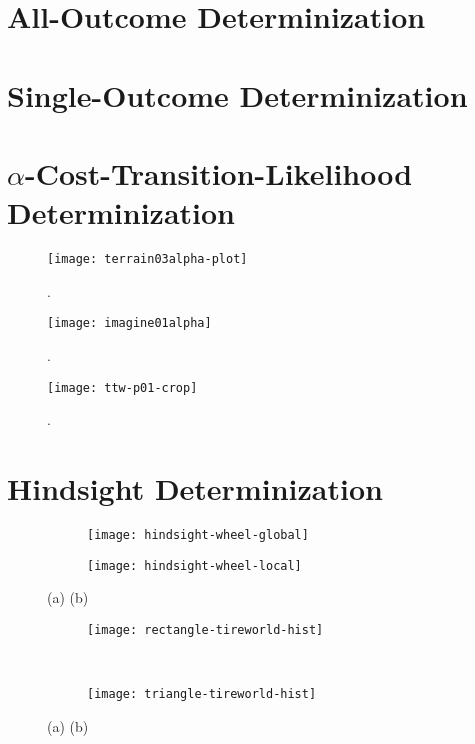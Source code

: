 \documentclass[../root.tex]{subfiles}
\begin{document}
\section{All-Outcome Determinization}

\section{Single-Outcome Determinization}

\section{$\alpha$-Cost-Transition-Likelihood Determinization}

\begin{figure}[tbhp]
	\centering
	\texttt{[image: terrain03alpha-plot]}

	\caption{}
	\label{fig:terrain03alpha-plot}. 
\end{figure}

\begin{figure}[p]
	\centering
	\texttt{[image: imagine01alpha]}
	\caption{}
	\label{fig:imagine01alpha}. 
\end{figure}

\begin{figure}[p]
	\centering
	\texttt{[image: ttw-p01-crop]}
	\caption{}
	\label{fig:ttwmap}. 
\end{figure}

\section{Hindsight Determinization}

\begin{figure}[tbhp]
	\centering
	\begin{subfigure}[b]{0.6\columnwidth}
		\texttt{[image: hindsight-wheel-global]}
		\caption{}
	\end{subfigure}
	
	\begin{subfigure}[b]{0.8\columnwidth}
		\texttt{[image: hindsight-wheel-local]}
		\caption{}
	\end{subfigure}
	\caption{
		(a) 
		(b)
	}
	\label{fig:hindsight-wheels}
\end{figure}

\begin{figure}[tbhp]
	\centering
	\begin{subfigure}[b]{0.56\columnwidth}
		\texttt{[image: rectangle-tireworld-hist]}
		\caption{}
	\end{subfigure}
	~
	\begin{subfigure}[b]{0.30\columnwidth}
		\texttt{[image: triangle-tireworld-hist]}
		\caption{}
	\end{subfigure}
	\caption{
		(a) 
		(b)
	}
	\label{fig:hindsight-hists}
\end{figure}

\end{document}

